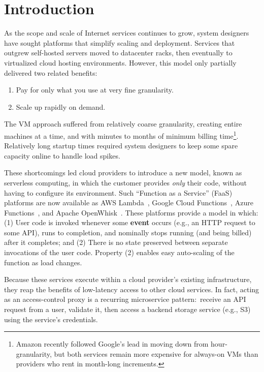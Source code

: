 \section{Introduction}
\label{sec:intro}

As the scope and scale of Internet services continues to grow, system designers
have sought platforms that simplify scaling and deployment.
Services that outgrew self-hosted servers moved to datacenter racks, then
eventually to virtualized cloud hosting environments.
However, this model only partially delivered two related benefits:
\begin{enumerate}
\item Pay for only what you use at very fine granularity.
\item Scale up rapidly on demand.
\end{enumerate}

The VM approach suffered from relatively coarse granularity, creating entire
machines at a time, and with minutes to months of minimum billing
time\footnote{Amazon recently followed Google's lead in moving down from
  hour-granularity, but both services remain more expensive for always-on VMs
  than providers who rent in month-long increments.}.  Relatively long startup
times required system designers to keep some spare capacity online to handle load
spikes.

These shortcomings led cloud providers to introduce a new model, known as
serverless computing, in which the customer provides \textit{only} their code,
without having to configure its environment.   Such ``Function as a Service''
(FaaS) platforms are now available as AWS Lambda~\cite{www-amazon-lambda}, Google
Cloud Functions~\cite{www-google-cf}, Azure Functions~\cite{www-microsoft-af}, and
Apache OpenWhisk~\cite{www-apache-openwhisk}.  These platforms provide a model in
which: (1)  User code is invoked whenever some \textbf{event} occurs (e.g., an HTTP
request to some API), runs to completion, and nominally stops running (and being
billed) after it completes; and (2)  There is no state preserved between
separate invocations of the user code.  Property (2) enables easy auto-scaling
of the function as load changes.


Because these services execute within a cloud provider's existing
infrastructure, they reap the benefits of low-latency access to other cloud
services.  In fact, acting as an access-control proxy is a recurring microservice
pattern:\ receive an API request from a user, validate it, then access
a backend storage service (e.g., S3) using the service's credentials.

